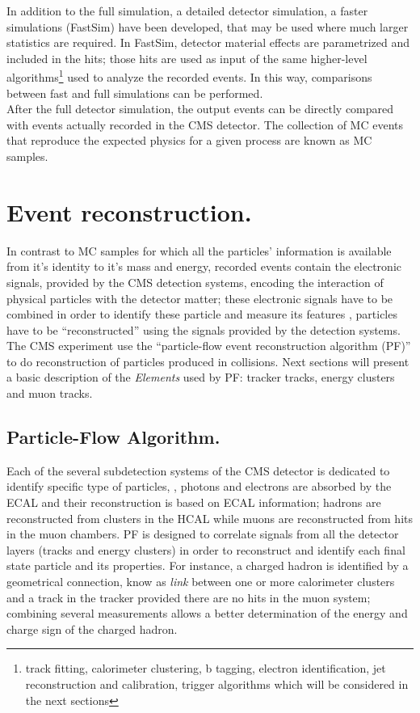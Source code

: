 \noindent In addition to the full simulation, \ie a detailed detector simulation, a faster simulations (FastSim) have been developed, that may be used where much larger statistics are required. In FastSim, detector material effects are parametrized and included in the hits; those hits are used as input of the same higher-level algorithms\footnote{track fitting, calorimeter clustering, b tagging, electron identification, jet reconstruction and calibration, trigger algorithms which will be considered in the next sections} used to analyze the recorded events. In this way, comparisons between fast and full simulations can be performed\cite{fastsim}.\\

\noindent After the full detector simulation, the output events can be directly compared with events actually recorded in the CMS detector. The collection of MC events that reproduce the expected physics for a given process are known as MC samples.

\section{Event reconstruction.}

\noindent In contrast to MC samples for which all the particles' information is available from it's identity to it's mass and energy, recorded events contain the electronic signals, provided by the CMS detection systems, encoding the interaction of physical particles with the detector matter; these electronic signals have to be combined in order to identify these particle and measure its features \ie, particles have to be ``reconstructed'' using the signals provided by the detection systems. The CMS experiment use the ``particle-flow event reconstruction algorithm (PF)'' to do reconstruction of particles produced in \pp collisions. Next sections will present a basic description of the \textit{Elements} used by PF: tracker tracks, energy clusters and muon tracks.   

\subsection{Particle-Flow Algorithm.}

\noindent Each of the several subdetection systems of the CMS detector is dedicated to identify specific type of particles, \ie, photons and electrons are absorbed by the ECAL and their reconstruction is based on ECAL information; hadrons are reconstructed from clusters in the HCAL while muons are reconstructed from hits in the muon chambers. PF is designed to correlate signals from all the detector layers (tracks and energy clusters) in order to reconstruct and identify each final state particle and its properties. For instance, a charged hadron is identified by a geometrical connection, know as \textit{link} between one or more calorimeter clusters and a track in the tracker provided there are no hits in the muon system; combining several measurements allows a better determination of the energy and charge sign of the charged hadron.   

